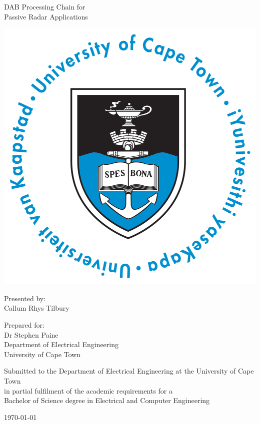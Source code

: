 \thispagestyle{empty}
\begin{center}
    
\Huge

\vspace{5cm}

DAB Processing Chain for\\Passive Radar Applications

\vspace{2.5cm}

\includegraphics[width=0.4\linewidth]{FrontMatter/UCT_logo.png}

\vfill

\large
Presented by:\\
Callum Rhys Tilbury

\vspace{1cm}

Prepared for:\\
Dr Stephen Paine\\
Department of Electrical Engineering\\
University of Cape Town

\vspace{2cm}

\small
Submitted to the Department of Electrical Engineering at the University of Cape Town\\
in partial fulfilment of the academic requirements for a\\
Bachelor of Science degree in Electrical and Computer Engineering

\vspace{2cm}

\today
\end{center}